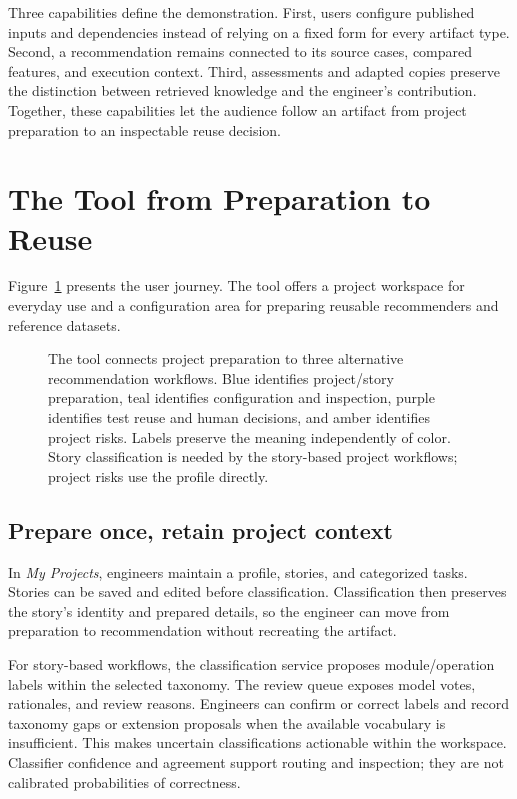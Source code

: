 \documentclass[10pt,conference]{IEEEtran}
\begin{document}
Three capabilities define the demonstration. First, users configure published inputs and dependencies instead of relying on a fixed form for every artifact type. Second, a recommendation remains connected to its source cases, compared features, and execution context. Third, assessments and adapted copies preserve the distinction between retrieved knowledge and the engineer's contribution. Together, these capabilities let the audience follow an artifact from project preparation to an inspectable reuse decision.

\section{The Tool from Preparation to Reuse}
\label{sec:tool}
Figure~\ref{fig:workflow} presents the user journey. The tool offers a project workspace for everyday use and a configuration area for preparing reusable recommenders and reference datasets.

\begin{figure}[t]
  \centering
  
  \caption{The tool connects project preparation to three alternative recommendation workflows. Blue identifies project/story preparation, teal identifies configuration and inspection, purple identifies test reuse and human decisions, and amber identifies project risks. Labels preserve the meaning independently of color. Story classification is needed by the story-based project workflows; project risks use the profile directly.}
  \label{fig:workflow}
\end{figure}

\subsection{Prepare once, retain project context}
In \textit{My Projects}, engineers maintain a profile, stories, and categorized tasks. Stories can be saved and edited before classification. Classification then preserves the story's identity and prepared details, so the engineer can move from preparation to recommendation without recreating the artifact.

For story-based workflows, the classification service proposes module/operation labels within the selected taxonomy. The review queue exposes model votes, rationales, and review reasons. Engineers can confirm or correct labels and record taxonomy gaps or extension proposals when the available vocabulary is insufficient. This makes uncertain classifications actionable within the workspace. Classifier confidence and agreement support routing and inspection; they are not calibrated probabilities of correctness.
\end{document}
